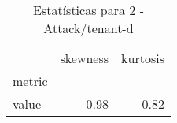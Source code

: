 \begin{table}[htbp]
\caption{Estatísticas para 2 - Attack/tenant-d}
\label{tab:2_-_attack_tenant-d_skewkurt}
\begin{tabular}{lrr}
\toprule
 & skewness & kurtosis \\
metric &  &  \\
\midrule
value & 0.98 & -0.82 \\
\bottomrule
\end{tabular}
\end{table}
